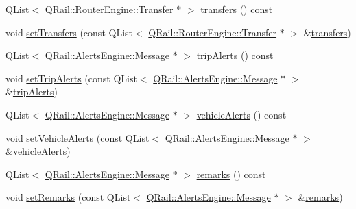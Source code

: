 \begin{DoxyCompactItemize}
Q\+List$<$ \mbox{\hyperlink{classQRail_1_1RouterEngine_1_1Transfer}{Q\+Rail\+::\+Router\+Engine\+::\+Transfer}} $\ast$ $>$ \mbox{\hyperlink{classQRail_1_1RouterEngine_1_1Route_a67674768d1b895227e8fe64d1b3f4e1f}{transfers}} () const
\item 
void \mbox{\hyperlink{classQRail_1_1RouterEngine_1_1Route_a1e1f995678ad634713f038364e48d809}{set\+Transfers}} (const Q\+List$<$ \mbox{\hyperlink{classQRail_1_1RouterEngine_1_1Transfer}{Q\+Rail\+::\+Router\+Engine\+::\+Transfer}} $\ast$ $>$ \&\mbox{\hyperlink{classQRail_1_1RouterEngine_1_1Route_a67674768d1b895227e8fe64d1b3f4e1f}{transfers}})
\item 
Q\+List$<$ \mbox{\hyperlink{classQRail_1_1AlertsEngine_1_1Message}{Q\+Rail\+::\+Alerts\+Engine\+::\+Message}} $\ast$ $>$ \mbox{\hyperlink{classQRail_1_1RouterEngine_1_1Route_ae304c1e025a25cce45d6bbf51d0c8308}{trip\+Alerts}} () const
\item 
void \mbox{\hyperlink{classQRail_1_1RouterEngine_1_1Route_a53b1077306e800418be4923643821179}{set\+Trip\+Alerts}} (const Q\+List$<$ \mbox{\hyperlink{classQRail_1_1AlertsEngine_1_1Message}{Q\+Rail\+::\+Alerts\+Engine\+::\+Message}} $\ast$ $>$ \&\mbox{\hyperlink{classQRail_1_1RouterEngine_1_1Route_ae304c1e025a25cce45d6bbf51d0c8308}{trip\+Alerts}})
\item 
Q\+List$<$ \mbox{\hyperlink{classQRail_1_1AlertsEngine_1_1Message}{Q\+Rail\+::\+Alerts\+Engine\+::\+Message}} $\ast$ $>$ \mbox{\hyperlink{classQRail_1_1RouterEngine_1_1Route_a8cc828d45bd8711e59197002f3881f90}{vehicle\+Alerts}} () const
\item 
void \mbox{\hyperlink{classQRail_1_1RouterEngine_1_1Route_ae902cb90a4a767ab8fa1dc38a6cc8e35}{set\+Vehicle\+Alerts}} (const Q\+List$<$ \mbox{\hyperlink{classQRail_1_1AlertsEngine_1_1Message}{Q\+Rail\+::\+Alerts\+Engine\+::\+Message}} $\ast$ $>$ \&\mbox{\hyperlink{classQRail_1_1RouterEngine_1_1Route_a8cc828d45bd8711e59197002f3881f90}{vehicle\+Alerts}})
\item 
Q\+List$<$ \mbox{\hyperlink{classQRail_1_1AlertsEngine_1_1Message}{Q\+Rail\+::\+Alerts\+Engine\+::\+Message}} $\ast$ $>$ \mbox{\hyperlink{classQRail_1_1RouterEngine_1_1Route_acf7c65a4556fa8bdccff820dd8f8acfd}{remarks}} () const
\item 
void \mbox{\hyperlink{classQRail_1_1RouterEngine_1_1Route_a4882ad008ab1eff92496fa76c2e15ee1}{set\+Remarks}} (const Q\+List$<$ \mbox{\hyperlink{classQRail_1_1AlertsEngine_1_1Message}{Q\+Rail\+::\+Alerts\+Engine\+::\+Message}} $\ast$ $>$ \&\mbox{\hyperlink{classQRail_1_1RouterEngine_1_1Route_acf7c65a4556fa8bdccff820dd8f8acfd}{remarks}})

\end{DoxyCompactItemize}
